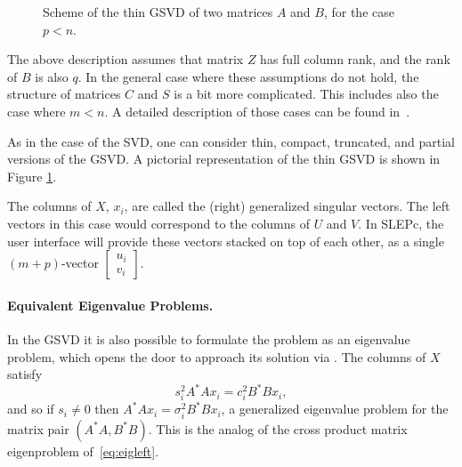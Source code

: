 \begin{figure}
\centering
{}
\caption{\label{fig:gsvd}Scheme of the thin GSVD of two matrices $A$ and $B$, for the case $p<n$.}
\end{figure}

The above description assumes that matrix $Z$ has full column rank, and the rank of $B$ is also $q$. In the general case where these assumptions do not hold, the structure of matrices $C$ and $S$ is a bit more complicated. This includes also the case where $m<n$. A detailed description of those cases can be found in~\citep[\S 2.3.5.3]{Anderson:1999:LUG}.

As in the case of the SVD, one can consider thin, compact, truncated, and partial versions of the GSVD. A pictorial representation of the thin GSVD is shown in Figure \ref{fig:gsvd}.

The columns of $X$, $x_i$, are called the (right) generalized singular vectors. The left vectors in this case would correspond to the columns of $U$ and $V$. In SLEPc, the user interface will provide these vectors stacked on top of each other, as a single $(m+p)$-vector $\begin{bmatrix}u_i\\v_i\end{bmatrix}$.

\paragraph{Equivalent Eigenvalue Problems.}
In the GSVD it is also possible to formulate the problem as an eigenvalue problem, which opens the door to approach its solution via . The columns of $X$ satisfy
\begin{equation}
\label{eq:gsvdeigcross}
s_i^2A^*Ax_i=c_i^2B^*Bx_i,
\end{equation}
and so if $s_i\neq 0$ then $A^*Ax_i=\sigma_i^2B^*Bx_i$, a generalized eigenvalue problem for the matrix pair $(A^*A,B^*B)$. This is the analog of the cross product matrix eigenproblem of~\eqref{eq:eigleft}.

